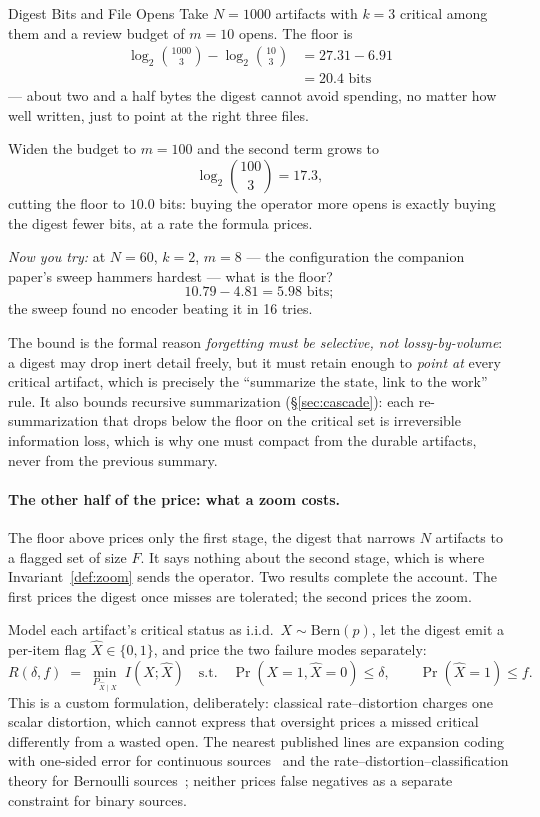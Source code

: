 \documentclass[11pt,a4paper]{article}
\theoremstyle{definition}
\theoremstyle{plain}
\begin{document}
\begin{pdexample}{Digest Bits and File Opens}
\setlength{\parskip}{4pt plus 1pt}
\label{ex:digest-review-budget}
Take $N=1000$ artifacts with $k=3$ critical among
them and a review budget of $m=10$ opens. The floor is
\[
\begin{aligned}
\log_2\binom{1000}{3}-\log_2\binom{10}{3}
&= 27.31 - 6.91\\
&= 20.4 \text{ bits}
\end{aligned}
\]
--- about two
and a half bytes the digest cannot avoid spending, no matter how well written, just
to point at the right three files.

Widen the budget to $m=100$ and the second term
grows to
\[
\log_2\binom{100}{3}=17.3,
\]
cutting the floor to $10.0$ bits: buying the
operator more opens is exactly buying the digest fewer bits, at a rate the formula
prices.

\emph{Now you try:} at $N=60$, $k=2$, $m=8$ --- the configuration the
companion paper's sweep hammers hardest --- what is the floor?
\[
10.79-4.81=5.98 \text{ bits};
\]
the sweep found no encoder beating it in 16 tries.
\end{pdexample}

The bound is the formal reason \emph{forgetting must be selective, not lossy-by-volume}:
a digest may drop inert detail freely, but it must retain enough to \emph{point at}
every critical artifact, which is precisely the ``summarize the state, link to
the work'' rule. It also bounds recursive summarization (\S\ref{sec:cascade}): each
re-summarization that drops below the floor on the critical set is irreversible
information loss, which is why one must compact from the durable artifacts, never from
the previous summary.

\paragraph{The other half of the price: what a zoom costs.} The floor above prices
only the first stage, the digest that narrows $N$ artifacts to a flagged set of size
$F$. It says nothing about the second stage, which is where Invariant~\ref{def:zoom}
sends the operator. Two results complete the account. The first prices the digest
once misses are tolerated; the second prices the zoom.

Model each artifact's critical status as i.i.d.\ $X\sim\mathrm{Bern}(p)$, let
the digest emit a per-item flag $\hat X\in\{0,1\}$, and price the two failure modes
separately:
\[
R(\delta,f)\;=\;\min_{P_{\hat X\mid X}}\; I(X;\hat X)
\quad\text{s.t.}\quad
\Pr(X{=}1,\hat X{=}0)\le\delta,
\qquad
\Pr(\hat X{=}1)\le f .
\]
This is a custom formulation, deliberately: classical rate--distortion charges one
scalar distortion, which cannot express that oversight prices a missed critical
differently from a wasted open. The nearest published lines are expansion coding
with one-sided error for continuous sources~ and the
rate--distortion--classification theory for Bernoulli sources~; neither
prices false negatives as a separate constraint for binary sources.
\end{document}
